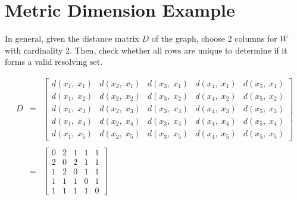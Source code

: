 \documentclass[12pt]{article}
\begin{document}
\section*{Metric Dimension Example}
\begin{minipage}[t]{0.65\textwidth}
\setlength{\parskip}{\baselineskip}

In general, given the distance matrix $D$ of the graph, choose 2 columns for $W$ with cardinality 2. Then, check whether all rows are unique to determine if it forms a valid resolving set.

\[
\begin{array}{lcl}
D
&=&
\left[ \begin{array}{lllll}
	d(x_1,\;x_1)&d(x_2,\;x_1)&d(x_3,\;x_1)&d(x_4,\;x_1)&d(x_5,\;x_1)\\
	d(x_1,\;x_2)&d(x_2,\;x_2)&d(x_3,\;x_2)&d(x_4,\;x_2)&d(x_5,\;x_2)\\
	d(x_1,\;x_3)&d(x_2,\;x_3)&d(x_3,\;x_3)&d(x_4,\;x_3)&d(x_5,\;x_3)\\
	d(x_1,\;x_4)&d(x_2,\;x_4)&d(x_3,\;x_4)&d(x_4,\;x_4)&d(x_5,\;x_4)\\
	d(x_1,\;x_5)&d(x_2,\;x_5)&d(x_3,\;x_5)&d(x_4,\;x_5)&d(x_5,\;x_5)
\end{array} \right]
\\ \\
&=&
\left[ \begin{array}{lllll}
	0 & 2 & 1 & 1 & 1 \\
	2 & 0 & 2 & 1 & 1 \\
	1 & 2 & 0 & 1 & 1 \\
	1 & 1 & 1 & 0 & 1 \\
	1 & 1 & 1 & 1 & 0
\end{array} \right]
\end{array}
\]

\end{minipage}
\hfill
\begin{minipage}[t]{0.3\textwidth}
	\begin{figure}[H]
		
	\end{figure}
\end{minipage}



\newpage
\end{document}
